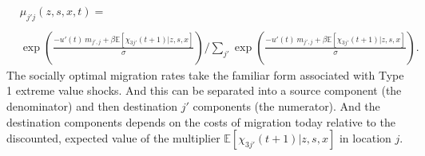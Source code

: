 \documentclass[12pt,pdftex]{article}
\begin{document}
\begin{onehalfspacing}
{\small
\begin{align}
& \mu_{j'j}(z,s,x,t) =  \nonumber \\
\nonumber \\
&\exp \left(\frac{- u'(t) \ m_{j',j} + \beta\mathbb{E}\left[\chi_{3j'}(t+1)| z, s,x \right]}{\sigma} \right)  \Bigg / \sum_{j'} \exp \left( \frac{-u'(t)\ m_{j',j} + \beta\mathbb{E}\left[\chi_{3j'}(t+1)| z,s,x \right]}{\sigma} \right).
\end{align}}The socially optimal migration rates take the familiar form associated with Type 1 extreme value shocks. And this can be separated into a source component (the denominator) and then destination $j'$ components (the numerator). And the destination components depends on the costs of migration today relative to the discounted, expected value of the multiplier $\mathbb{E}\left[\chi_{3j'}(t+1)|z, s,x \right]$ in location $j$. 



\end{onehalfspacing}
\end{document}
